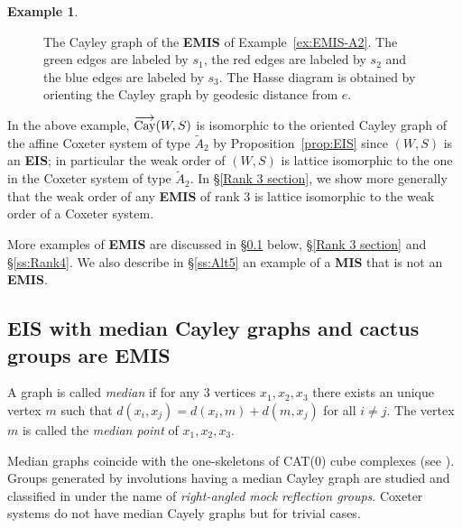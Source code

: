 \documentclass[A4paper, oneside]{amsart}
\newcommand{\id}{\textit{e}}
\newcommand{\oCay}{%
  \operatorname{%
    \overset{\smash{\raisebox{-0.45ex}{$\longrightarrow$}}}{\textnormal{Cay}}%
  }%
}
\newcommand{\EIS}{\textnormal{\bf EIS}\xspace}
\newcommand{\EMIS}{\textnormal{\bf EMIS}\xspace}
\newcommand{\MIS}{\textnormal{\bf MIS}\xspace}
\theoremstyle{definition}
\newtheorem{ex}[thm]{Example}
\begin{document}
\begin{ex}
\begin{center}
\begin{figure}
\caption{The Cayley graph of the \EMIS of Example~\ref{ex:EMIS-A2}. The green edges are labeled by $s_1$, the red edges are labeled by $s_2$ and the blue edges are labeled by $s_3$. The Hasse diagram is obtained by orienting the Cayley graph by geodesic distance from $e$.}
\label{fig:EMIS-A2}
\end{figure}
\end{center}
\end{ex}

In the above example, $\oCay(W,S)$ is isomorphic to the oriented Cayley graph of the affine Coxeter system of type $\tilde A_2$ by Proposition~\ref{prop:EIS} since $(W,S)$ is an \EIS; in particular the weak order of $(W,S)$ is lattice isomorphic to the one in the Coxeter system of type $\tilde A_2$. In \S\ref{Rank 3 section}, we show more generally that the weak order of any \EMIS of rank $3$ is lattice isomorphic to the weak order of a Coxeter system.  

More examples of \EMIS are discussed in \S\ref{Median subsection} below, \S\ref{Rank 3 section} and \S\ref{ss:Rank4}. We also describe in \S\ref{ss:Alt5} an example of a \MIS that is not an \EMIS.


\subsection{\EIS with median Cayley graphs and cactus groups are \EMIS} \label{Median subsection} A graph is called \emph{median} if for any 3 vertices $x_1,x_2,x_3$ there exists an unique vertex $m$ such that $d(x_i,x_j) = d(x_i,m)+d(m,x_j)$ for all $i\neq j$. The vertex $m$ is called the \emph{median point} of $x_1,x_2,x_3$. 

Median graphs coincide with the one-skeletons of CAT(0) cube complexes (see \cite{MedianCAT(0)1, MedianCAT(0)2, MedianCAT(0)3}). Groups generated by involutions having a median Cayley graph are studied and classified in \cite{RAMRG} under the name of \emph{right-angled mock reflection groups}. Coxeter systems do not have median Cayely graphs but for trivial cases.  
\end{document}
